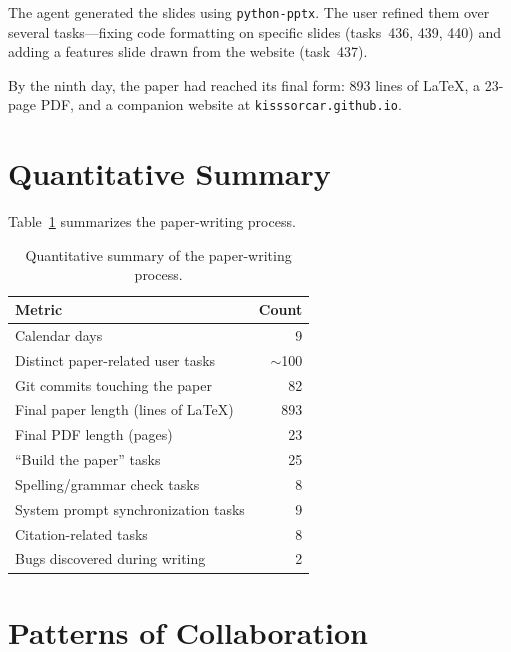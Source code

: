 \documentclass{article}
\begin{document}
The agent generated the slides using \texttt{python-pptx}.  The user refined them over several tasks---fixing code formatting on specific slides (tasks~436, 439, 440) and adding a features slide drawn from the website (task~437).

By the ninth day, the paper had reached its final form: 893 lines of \LaTeX{}, a 23-page PDF, and a companion website at \texttt{kisssorcar.github.io}.

\section{Quantitative Summary}
\label{sec:quantitative}

Table~\ref{tab:summary} summarizes the paper-writing process.

\begin{table}[h]
\centering
\caption{Quantitative summary of the paper-writing process.}
\label{tab:summary}
\begin{tabular}{lr}
\toprule
\textbf{Metric} & \textbf{Count} \\
\midrule
Calendar days & 9 \\
Distinct paper-related user tasks & $\sim$100 \\
Git commits touching the paper & 82 \\
Final paper length (lines of \LaTeX{}) & 893 \\
Final PDF length (pages) & 23 \\
``Build the paper'' tasks & 25 \\
Spelling/grammar check tasks & 8 \\
System prompt synchronization tasks & 9 \\
Citation-related tasks & 8 \\
Bugs discovered during writing & 2 \\
\bottomrule
\end{tabular}
\end{table}

\section{Patterns of Collaboration}
\label{sec:patterns}
\end{document}
